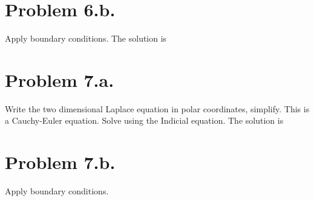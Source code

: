 \documentclass{article}
\begin{document}
\section*{Problem 6.b.}
Apply boundary conditions.
The solution is 
\section*{Problem 7.a.}
Write the two dimensional Laplace equation in polar coordinates, simplify.
This is a Cauchy-Euler equation. Solve using the Indicial equation.
The solution is
\section*{Problem 7.b.}
Apply boundary conditions.
\end{document}

